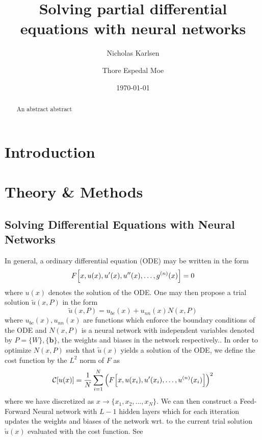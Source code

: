 \documentclass[reprint, english, nofootinbib]{revtex4-2}
\begin{document}
\title{Solving partial differential equations with neural networks}
\author{Nicholas Karlsen}
\author{Thore Espedal Moe}
\date{\today}

\begin{abstract}
    An abstract abstract
\end{abstract}

\maketitle

\section{Introduction}

\section{Theory \& Methods}

\subsection{Solving Differential Equations with Neural Networks}
\noindent
In general, a ordinary differential equation (ODE) may be written in the form
\begin{equation}
    F \qty[x, u(x), u'(x), u''(x), \dots, g^{(n)}(x)] = 0
\end{equation}    
where $u(x)$ denotes the solution of the ODE. One may then propose a trial solution $\tilde u(x,P)$ in the form
\begin{equation}
    \tilde u(x, P) = u_{bc}(x) + u_{nn}(x)N(x, P) 
\end{equation}
where $u_{bc}(x), u_{nn}(x)$ are functions which enforce the boundary conditions of the ODE and $N(x, P)$ is a neural network with independent variables denoted by $P = \{W\},\{\pmb b\}$, the weights and biases in the network respectively.. In order to optimize $N(x, P)$ such that $\tilde u(x)$ yields a solution of the ODE, we define the cost function by the $L^2$ norm of $F$ as
\begin{equation}
    \mathcal C\qty[u\qty(x)] = \frac{1}{N} \sum_{i=1}^{N}\qty(F\qty[x, u(x_i), u'(x_i), \dots, u^{(n)}(x_i)])^2
\end{equation}
where we have discretized as $x \rightarrow \{x_1, x_2 ,\dots, x_{N}\}$. We can then construct a Feed-Forward Neural network with $L-1$ hidden layers which for each itteration updates the weights and biases of the network wrt. to the current trial solution $\tilde u(x)$ evaluated with the cost function. See \cite{4155_project_2}
\end{document}
